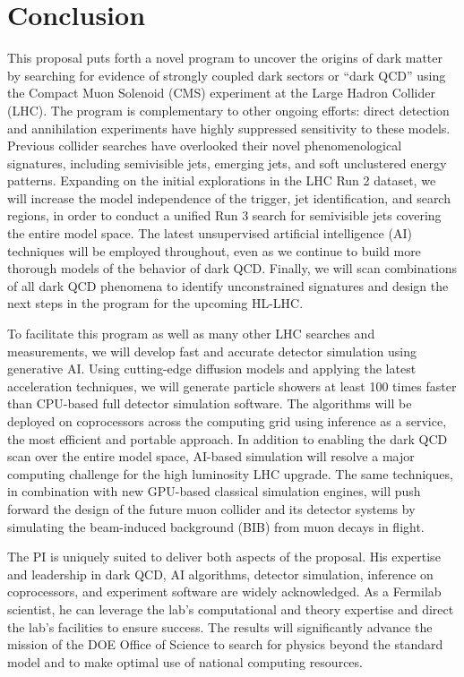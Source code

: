 \section{Conclusion}\label{sec:conclusion}

This proposal puts forth a novel program to uncover the origins of dark matter
by searching for evidence of strongly coupled dark sectors or ``dark QCD''
using the Compact Muon Solenoid (CMS) experiment at the Large Hadron Collider (LHC).
The program is complementary to other ongoing efforts:
direct detection and annihilation experiments have highly suppressed sensitivity to these models.
Previous collider searches have overlooked their novel phenomenological signatures,
including semivisible jets, emerging jets, and soft unclustered energy patterns.
Expanding on the initial explorations in the LHC Run 2 dataset,
we will increase the model independence of the trigger, jet identification, and search regions,
in order to conduct a unified Run 3 search for semivisible jets covering the entire model space.
The latest unsupervised artificial intelligence (AI) techniques will be employed throughout,
even as we continue to build more thorough models of the behavior of dark QCD.
Finally, we will scan combinations of all dark QCD phenomena to identify unconstrained signatures
and design the next steps in the program for the upcoming HL-LHC.

To facilitate this program as well as many other LHC searches and measurements,
we will develop fast and accurate detector simulation using generative AI.
Using cutting-edge diffusion models and applying the latest acceleration techniques,
we will generate particle showers at least 100 times faster than CPU-based full detector simulation software.
The algorithms will be deployed on coprocessors across the computing grid using inference as a service,
the most efficient and portable approach.
In addition to enabling the dark QCD scan over the entire model space,
AI-based simulation will resolve a major computing challenge for the high luminosity LHC upgrade.
The same techniques, in combination with new GPU-based classical simulation engines,
will push forward the design of the future muon collider and its detector systems
by simulating the beam-induced background (BIB) from muon decays in flight.

The PI is uniquely suited to deliver both aspects of the proposal.
His expertise and leadership in dark QCD, AI algorithms, detector simulation, inference on coprocessors, and experiment software are widely acknowledged.
As a Fermilab scientist, he can leverage the lab's computational and theory expertise and direct the lab's facilities to ensure success.
The results will significantly advance the mission of the DOE Office of Science to search for physics beyond the standard model and to make optimal use of national computing resources.


